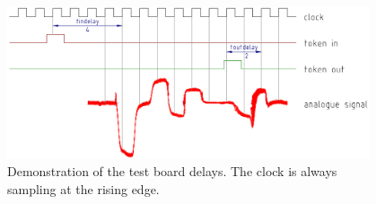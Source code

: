 \documentclass[british,11pt,a4paper]{memoir}
\begin{document}
\begin{figure}[ht]
	\centering
	\includegraphics[width=0.95\textwidth]{tbdelays}
	\caption{Demonstration of the test board delays. The clock is always sampling at the rising edge.}
	\label{pdelays}
\end{figure}\no
\end{document}
